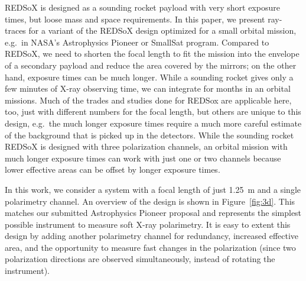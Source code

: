 \documentclass[]{spie}  %
\begin{document}
REDSoX is designed as a sounding rocket payload with very short exposure times, but loose mass and space requirements. In this paper, we present ray-traces for a variant of the REDSoX design optimized for a small orbital mission, e.g.\ in NASA's Astrophysics Pioneer or SmallSat program. Compared to REDSoX, we need to shorten the focal length to fit the mission into the envelope of a secondary payload and reduce the area covered by the mirrors; on the other hand, exposure times can be much longer. While a sounding rocket gives only a few minutes of X-ray observing time, we can integrate for months in an orbital missions. Much of the trades and studies done for REDSox\cite{redsoxtrace} are applicable here, too, just with different numbers for the focal length, but others are unique to this design, e.g.\ the much longer exposure times require a much more careful estimate of the background that is picked up in the detectors.
While the sounding rocket REDSoX is designed with three polarization channels, an orbital mission with much longer exposure times can work with just one or two channels because lower effective areas can be offset by longer exposure times.

In this work, we consider a system with a focal length of just 1.25~m and a single polarimetry channel. An overview of the design is shown in Figure~\ref{fig:3d}. This matches our submitted Astrophysics Pioneer proposal and represents the simplest possible instrument to measure soft X-ray polarimetry. It is easy to extent this design by adding another polarimetry channel for redundancy, increased effective area, and the opportunity to measure fast changes in the polarization (since two polarization directions are observed simultaneously, instead of rotating the instrument). 
\end{document}
